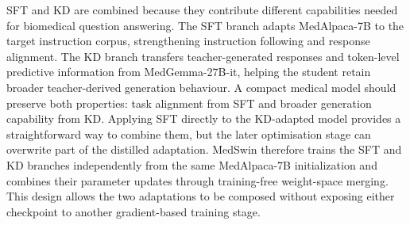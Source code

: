\documentclass[conference]{IEEEtran}
\begin{document}





SFT and KD are combined because they contribute different capabilities needed for biomedical question answering. The SFT branch adapts MedAlpaca-7B to the target instruction corpus, strengthening instruction following and response alignment. The KD branch transfers teacher-generated responses and token-level predictive information from MedGemma-27B-it, helping the student retain broader teacher-derived generation behaviour. A compact medical model should preserve both properties: task alignment from SFT and broader generation capability from KD. Applying SFT directly to the KD-adapted model provides a straightforward way to combine them, but the later optimisation stage can overwrite part of the distilled adaptation. MedSwin therefore trains the SFT and KD branches independently from the same MedAlpaca-7B initialization and combines their parameter updates through training-free weight-space merging. This design allows the two adaptations to be composed without exposing either checkpoint to another gradient-based training stage.
\end{document}
